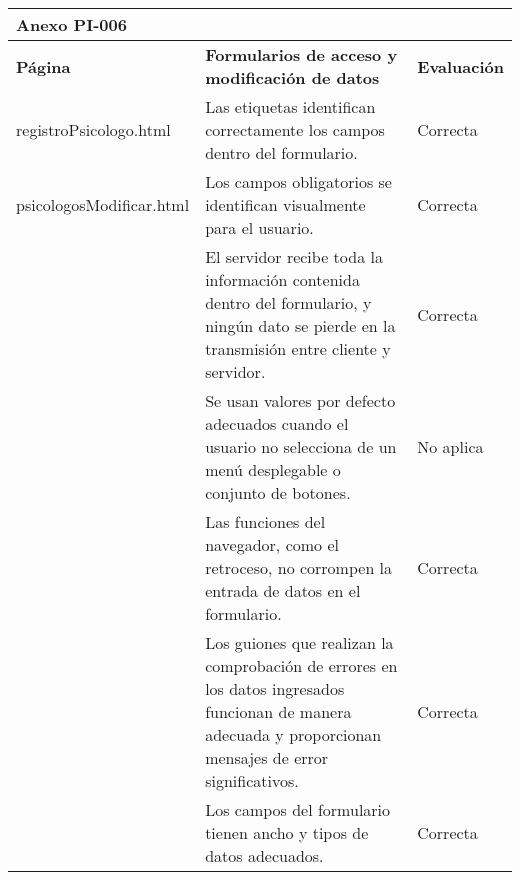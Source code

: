 \begin{table}[htpb]
\centering
\begin{tabularx}{\textwidth}{|l|X|l|}
\hline
\multicolumn{3}{|l|}{\textbf{Anexo PI-006}}                                                                                                                                                                                                            \\ \hline
\textbf{Página}                                                     & \textbf{Formularios de acceso y modificación de datos}                                                                                                    & \textbf{Evaluación} \\ \hline
registroPsicologo.html & Las etiquetas identifican correctamente los campos dentro del formulario.                                                                                 & Correcta            \\ \cline{2-3} 
psicologosModificar.html                                                                    & Los campos obligatorios se identifican visualmente para el usuario.                                                                                       & Correcta            \\ \cline{2-3} 
                                                                    & El servidor recibe toda la información contenida dentro del formulario, y ningún dato se pierde en la transmisión entre cliente y servidor.               & Correcta            \\ \cline{2-3} 
                                                                    & Se usan valores por defecto adecuados cuando el usuario no selecciona de un menú desplegable o conjunto de botones.                                       & No aplica           \\ \cline{2-3} 
                                                                    & Las funciones del navegador, como el retroceso, no corrompen la entrada de datos en el formulario.                                                        & Correcta            \\ \cline{2-3} 
                                                                    & Los guiones que realizan la comprobación de errores en los datos ingresados funcionan de manera adecuada y proporcionan mensajes de error significativos. & Correcta            \\ \cline{2-3} 
                                                                    & Los campos del formulario tienen ancho y tipos de datos adecuados.                                                                                        & Correcta            \\ \cline{2-3} 

\end{tabularx}
\end{table}
